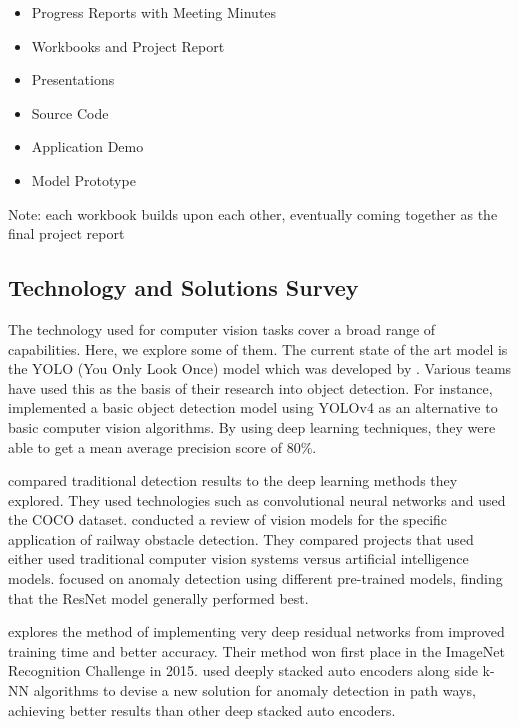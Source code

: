 \documentclass[stu,12pt,floatsintext]{apa7}
\begin{document}
\begin{itemize}
    \item Progress Reports with Meeting Minutes 
    \item Workbooks and Project Report
    \item Presentations
    \item Source Code
    \item Application Demo
    \item Model Prototype
\end{itemize}
Note: each workbook builds upon each other, eventually coming together as the final project report


\subsection{Technology and Solutions Survey}
The technology used for computer vision tasks cover a broad range of capabilities. Here, we explore some of them. The current state of the art model is the YOLO (You Only Look Once) model which was developed by \textcite{redmon_you_2016}. Various teams have used this as the basis of their research into object detection. For instance, \textcite{sarda_object_2021} implemented a basic object detection model using YOLOv4 as an alternative to basic computer vision algorithms. By using deep learning techniques, they were able to get a mean average precision score of 80\%.

\textcite{gao_obstacle_2024} compared traditional detection results to the deep learning methods they explored. They used technologies such as convolutional neural networks and used the COCO dataset. \textcite{ristic-durrant_review_2021} conducted a review of vision models for the specific application of railway obstacle detection. They compared projects that used either used traditional computer vision systems versus artificial intelligence models. \textcite{wenning_anomaly_2022} focused on anomaly detection using different pre-trained models, finding that the ResNet model generally performed best.

\textcite{he_deep_2016} explores the method of implementing very deep residual networks from improved training time and better accuracy. Their method won first place in the ImageNet Recognition Challenge in 2015. \textcite{dairi_obstacle_2018} used deeply stacked auto encoders along side k-NN algorithms to devise a new solution for anomaly detection in path ways, achieving better results than other deep stacked auto encoders. 
\end{document}
